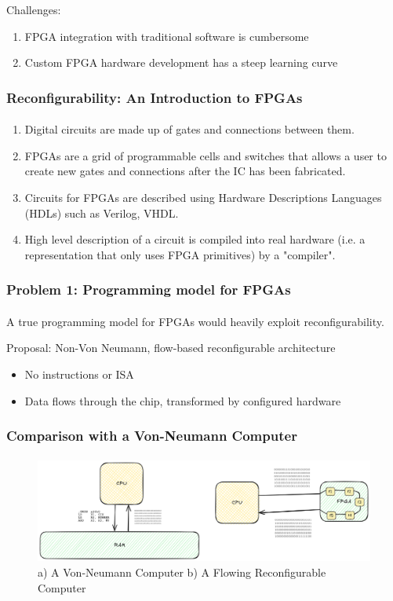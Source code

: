 \documentclass{beamer}
\begin{document}
{\begin{frame}[fragile]
Challenges:
  \begin{enumerate}
    \item FPGA integration with traditional software is cumbersome
    \item Custom FPGA hardware development has a steep learning curve
  \end{enumerate}
\end{frame}

\begin{frame}[fragile]
\frametitle{Reconfigurability: An Introduction to FPGAs}
\framesubtitle{}
  \begin{enumerate}
    \item Digital circuits are made up of gates and connections between
      them.
    \item FPGAs are a grid of programmable cells and switches that allows
      a user to create new gates and connections after the IC has been
      fabricated.
    \item Circuits for FPGAs are described using Hardware Descriptions Languages
      (HDLs) such as Verilog, VHDL.
    \item High level description of a circuit is compiled into real hardware
      (i.e. a representation that only uses FPGA primitives) by a "compiler".
  \end{enumerate}

\end{frame}

\begin{frame}[fragile]
\frametitle{Problem 1: Programming model for FPGAs}
\framesubtitle{}
  A true programming model for FPGAs would heavily exploit reconfigurability.

Proposal: Non-Von Neumann, flow-based reconfigurable architecture
  \begin{itemize}
    \item No instructions or ISA
    \item Data flows through the chip, transformed by configured hardware
  \end{itemize}
\end{frame}

\begin{frame}[fragile]
  \frametitle{Comparison with a Von-Neumann Computer}
  \framesubtitle{}
  \begin{figure}
    \centering
    \includegraphics[width=1.0\textwidth]{images/flow.png}
    \caption{a) A Von-Neumann Computer b) A Flowing Reconfigurable Computer}
    \label{}
  \end{figure}
\end{frame}

}
\end{document}
